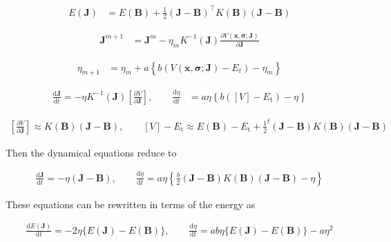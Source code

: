 \documentclass{article}
\begin{document}
\begin{align*}
E(\boldsymbol{J}) &= E(\boldsymbol{B}) + \frac{1}{2} (\boldsymbol{J} - \boldsymbol{B})^{\top} K(\boldsymbol{B})(\boldsymbol{J} - \boldsymbol{B})
\tag{8.83}
\end{align*}

\begin{align*}
\boldsymbol{J}^{m+1} &= \boldsymbol{J}^{m} - \eta_{m} K^{-1}(\boldsymbol{J}) \frac{\partial V(\boldsymbol{x}, \boldsymbol{\sigma}; \boldsymbol{J})}{\partial \boldsymbol{J}}
\tag{8.84}
\end{align*}

\begin{align*}
\eta_{m+1} &= \eta_{m} + a \left\{b \left(V(\boldsymbol{x}, \boldsymbol{\sigma}; \boldsymbol{J}) - E_{t}\right) - \eta_{m}\right\}
\tag{8.85}
\end{align*}

\begin{align*}
\frac{\mathrm{d} \boldsymbol{J}}{\mathrm{d} t} = -\eta K^{-1}(\boldsymbol{J}) \left[\frac{\partial V}{\partial \boldsymbol{J}}\right], \qquad \frac{\mathrm{d} \eta}{\mathrm{d} t} &= a \eta \left\{b([V] - E_{\mathrm{t}}) - \eta\right\}
\tag{8.86}
\end{align*}

\begin{align*}
\left[\frac{\partial V}{\partial \boldsymbol{J}}\right] \approx K(\boldsymbol{B})(\boldsymbol{J}-\boldsymbol{B}),
\qquad
[V]-E_{\mathrm{t}} \approx E(\boldsymbol{B})-E_{\mathrm{t}}+\frac{1}{2}^{t}(\boldsymbol{J}-\boldsymbol{B}) K(\boldsymbol{B})(\boldsymbol{J}-\boldsymbol{B})
\tag{8.87}
\end{align*}

Then the dynamical equations reduce to

\begin{align*}
\frac{\mathrm{d} \boldsymbol{J}}{\mathrm{d} t} =-\eta(\boldsymbol{J}-\boldsymbol{B}),
\qquad
\frac{\mathrm{d} \eta}{\mathrm{d} t} =a \eta\left\{\frac{b}{2}(\boldsymbol{J}-\boldsymbol{B}) K(\boldsymbol{B})(\boldsymbol{J}-\boldsymbol{B})-\eta\right\}
\tag{8.88}
\end{align*}

These equations can be rewritten in terms of the energy as

\begin{align*}
\frac{\mathrm{d} E(\boldsymbol{J})}{\mathrm{d} t}=-2 \eta\{E(\boldsymbol{J})-E(\boldsymbol{B})\},
\qquad
\frac{\mathrm{d} \eta}{\mathrm{d} t}=a b \eta\{E(\boldsymbol{J})-E(\boldsymbol{B})\}-a \eta^{2}
\tag{8.89}
\end{align*}
\end{document}
